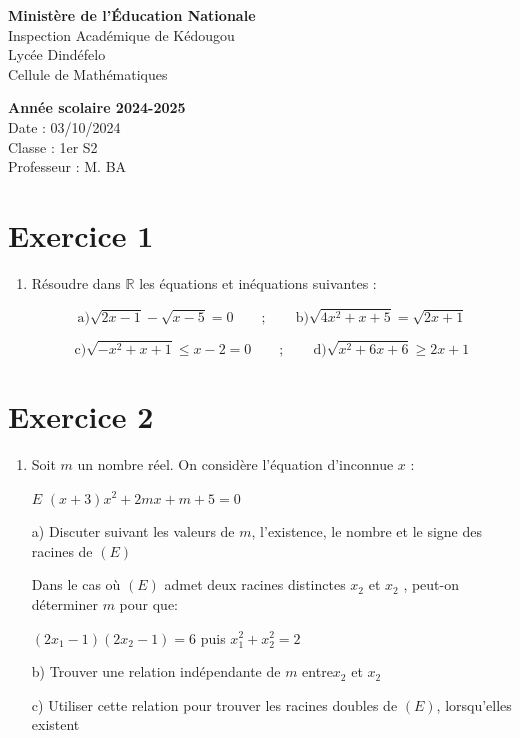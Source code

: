 \documentclass[12pt]{article}
\begin{document}
\noindent
\begin{minipage}[t]{0.48\textwidth}
\raggedright
\textbf{Ministère de l'Éducation Nationale}\\
Inspection Académique de Kédougou\\
Lycée Dindéfelo\\
Cellule de Mathématiques
\end{minipage}
\hfill
\begin{minipage}[t]{0.48\textwidth}
\raggedleft
\textbf{Année scolaire 2024-2025}\\
Date : 03/10/2024\\
Classe : 1er S2\\
Professeur : M. BA
\end{minipage}

\vspace{1cm}
\section*{Exercice 1}
\begin{enumerate}
\item Résoudre dans \( \mathbb{R} \) les équations et inéquations suivantes :

\[ \text{a)} \sqrt{2x-1}-\sqrt{x-5} = 0    \quad\quad;\quad\quad   \text{b)} \sqrt{4x^{2}+x+5}=\sqrt{2x+1} \]

\[ \text{c)} \sqrt{-x^{2}+x+1} \leq x-2 = 0    \quad\quad;\quad\quad   \text{d)} \sqrt{x^{2}+6x+6} \geq 2x+1 \]

\end{enumerate}
\section*{Exercice 2}
\begin{enumerate}
\item Soit \( m \) un nombre réel. On considère l’équation d’inconnue \( x \) :

\( E \) \( (x+3)x^{2} +2mx + m + 5 = 0\)
\item[a)] Discuter suivant les valeurs de \( m \), l’existence, le nombre et le signe des racines de \( (E) \) 

Dans le cas où \( (E) \) admet deux racines distinctes \( x_{2} \) et \( x_{2} \) , peut-on déterminer \( m \) pour que:

\( ( 2x_{1} - 1 ) (2x_{2}-1) = 6 \) puis \( x_{1}^{2} + x_{2}^{2} = 2 \)

\item[b)]Trouver une relation indépendante de \( m \) entre\( x_{2} \) et \( x_{2} \)
\item[c)]Utiliser cette relation pour trouver les racines doubles de \( (E) \), lorsqu’elles existent
\end{enumerate}
\end{document}
